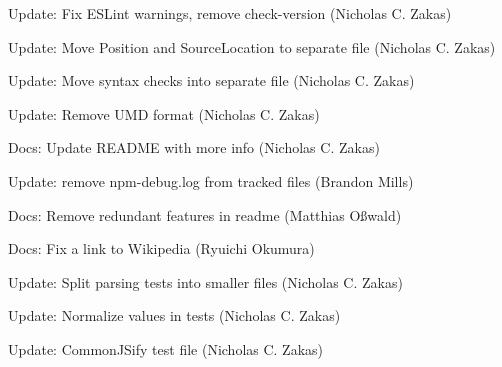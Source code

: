 \begin{DoxyItemize}
\item Update\+: Fix ESLint warnings, remove check-\/version (Nicholas C. Zakas)
\item Update\+: Move Position and Source\+Location to separate file (Nicholas C. Zakas)
\item Update\+: Move syntax checks into separate file (Nicholas C. Zakas)
\item Update\+: Remove UMD format (Nicholas C. Zakas)
\item Docs\+: Update README with more info (Nicholas C. Zakas)
\item Update\+: remove npm-\/debug.\+log from tracked files (Brandon Mills)
\item Docs\+: Remove redundant \textquotesingle{}features\textquotesingle{} in readme (Matthias Oßwald)
\item Docs\+: Fix a link to Wikipedia (Ryuichi Okumura)
\item Update\+: Split parsing tests into smaller files (Nicholas C. Zakas)
\item Update\+: Normalize values in tests (Nicholas C. Zakas)
\item Update\+: Common\+JSify test file (Nicholas C. Zakas) 
\end{DoxyItemize}